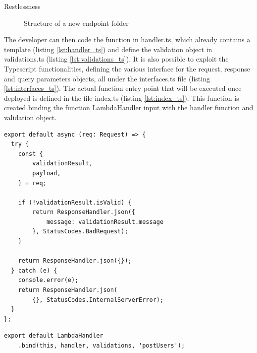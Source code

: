 \begin{chapter}{Restlessness}
    \begin{figure}
        \begin{minipage}{\linewidth}
        \end{minipage}
        \caption{Structure of a new endpoint folder}
        \label{fig:new_endpoint_folder_structure}
    \end{figure}

    The developer can then code the function in handler.ts, which already contains a
    template (listing \ref{lst:handler_ts}) and define the validation object in
    validations.ts (listing \ref{lst:validations_ts}).
    It is also possible to exploit the Typescript functionalities, defining the various
    interface for the request, response and query parameters objects, all under the
    interfaces.ts file (listing \ref{lst:interfaces_ts}).
    The actual function entry point that will be executed once deployed is defined
    in the file index.ts (listing \ref{lst:index_ts}). This function is created binding
    the function LambdaHandler input with the handler function and validation object.

    \clearpage

    \begin{lstlisting}[caption=handler.ts content, label={lst:handler_ts}]
export default async (req: Request) => {
  try {
    const {
        validationResult,
        payload,
    } = req;

    if (!validationResult.isValid) {
        return ResponseHandler.json({
            message: validationResult.message
        }, StatusCodes.BadRequest);
    }

    return ResponseHandler.json({});
  } catch (e) {
    console.error(e);
    return ResponseHandler.json(
        {}, StatusCodes.InternalServerError);
  }
};
    \end{lstlisting}

    \bigskip
    \begin{lstlisting}[caption=index.ts content, label={lst:index_ts}]
export default LambdaHandler
    .bind(this, handler, validations, 'postUsers');
    \end{lstlisting}


\end{chapter}

